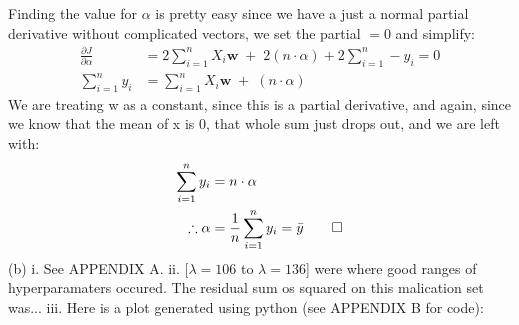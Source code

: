 \documentclass[11pt]{article}
\theoremstyle{quest}
\begin{document}
Finding the value for $\alpha$ is pretty easy since we have a just a normal partial derivative without complicated vectors, we set the partial $= 0$ and simplify:
\begin{equation}
  \begin{split}
    \nonumber
    \frac{\partial J}{\partial \alpha} &= 2\sum_{i=1}^{n} X_i \mathbf{w} \;+\; 2(n\cdot\alpha) + 2\sum_{i=1}^{n} -y_i = 0\\
    \sum_{i=1}^{n} y_i  &= \sum_{i=1}^{n} X_i \mathbf{w} \;+\; (n\cdot\alpha)
  \end{split}
\end{equation}
We are treating w as a constant, since this is a partial derivative, and again, since we know that the mean of x is 0, that whole sum just drops out, and we are left with:
\begin{equation}
  \begin{split}
    \nonumber
    \sum_{i=1}^{n} y_i  &= n\cdot\alpha\\
    \therefore \alpha &= \frac{1}{n}\sum_{i=1}^{n} y_i = \bar{y} \qed
  \end{split}
\end{equation}
\subitem(b)
  \subsubitem i. See APPENDIX A.
  \subsubitem ii. [$\lambda=106$ to $\lambda=136$] were where good ranges of hyperparamaters occured. The residual sum os squared on this malication set was...
  \subsubitem iii. Here is a plot generated using python (see APPENDIX B for code):
\end{document}
